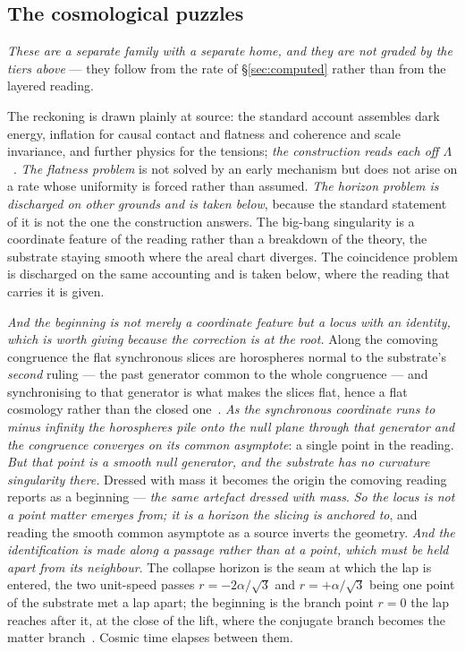 \documentclass[11pt,a4paper]{article}
\theoremstyle{plain}
\theoremstyle{definition}
\begin{document}
\subsection{The cosmological puzzles}

\emph{These are a separate family with a separate home, and they are not graded by the tiers above} --- they
follow from the rate of \S\ref{sec:computed} rather than from the layered reading.

The reckoning is drawn plainly at source: the standard account assembles dark energy, inflation for causal
contact and flatness and coherence and scale invariance, and further physics for the tensions; \emph{the
construction reads each off $\Lambda$}~\cite{JanzenCRcosmology}. \emph{The flatness problem} is not solved by an early mechanism
but does not arise on a rate whose uniformity is forced rather than assumed. \emph{The horizon problem is
discharged on other grounds and is taken below}, because the standard statement of it is not the one the
construction answers. The big-bang singularity is a coordinate feature of the reading rather than a breakdown
of the theory, the substrate staying smooth where the areal chart diverges. The coincidence problem is discharged on the same accounting and is taken
below, where the reading that carries it is given.

\emph{And the beginning is not merely a coordinate feature but a locus with an identity, which is worth
giving because the correction is at the root.} Along the comoving congruence the flat synchronous slices are
horospheres normal to the substrate's \emph{second} ruling --- the past generator common to the whole
congruence --- and synchronising to that generator is what makes the slices flat, hence a flat cosmology
rather than the closed one~\cite{JanzenOperator}. \emph{As the synchronous coordinate runs to minus
infinity the horospheres pile onto the null plane through that generator and the congruence converges on its
common asymptote}: a single point in the reading. \emph{But that point is a smooth null generator, and the
substrate has no curvature singularity there.} Dressed with mass it becomes the origin the comoving reading
reports as a beginning --- \emph{the same artefact dressed with mass}. \emph{So the locus is not a point
matter emerges from; it is a horizon the slicing is anchored to}, and reading the smooth common asymptote as
a source inverts the geometry. \emph{And the identification is made along a passage rather than at a point, which must be held apart from
its neighbour}. The collapse horizon is the seam at which the lap is entered, the two unit-speed passes
$r=-2\alpha/\sqrt3$ and $r=+\alpha/\sqrt3$ being one point of the substrate met a lap apart; the beginning is
the branch point $r=0$ the lap reaches after it, at the close of the lift, where the conjugate branch becomes
the matter branch~\cite{JanzenOperator,JanzenCRcosmology,JanzenCosmogenesis}. Cosmic time elapses between them.
\end{document}
